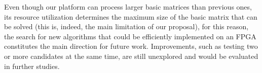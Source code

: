 \documentclass[authoryear,preprint,review,12pt]{elsarticle}
\begin{document}
Even though our platform can process larger basic matrices than previous ones, its resource utilization 
determines the maximum size of the basic matrix that can be solved (this is, indeed, the 
main limitation of our proposal), for this reason, the search for new algorithms that could be efficiently implemented on an FPGA constitutes the main direction for future work. Improvements, such as testing two 
or more candidates at the same time, are still unexplored and would be evaluated in further studies.






\end{document}

